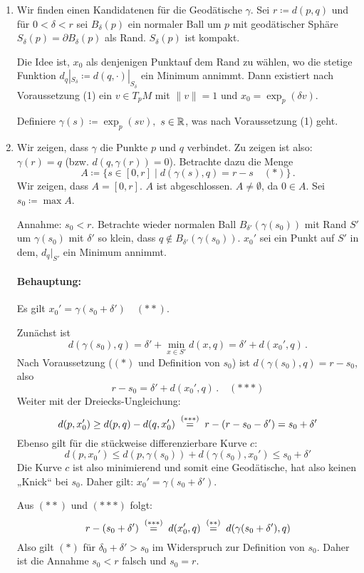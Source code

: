 \documentclass[a4paper,twoside,DIV15,BCOR12mm]{scrbook}
\renewcommand{\da}{\coloneqq}
\begin{document}
\begin{beweis}
\begin{enumerate}[1. {Schritt:}]
\item Wir finden einen Kandidatenen für die Geodätische $\gamma$. Sei $r\da d(p,q)$ und für $0< \delta < r$ sei $B_\delta(p)$ ein normaler Ball um $p$ mit geodätischer Sphäre $S_\delta(p) = \partial B_\delta(p)$ als Rand. $S_\delta(p)$ ist kompakt.

Die Idee ist, $x_0$ als denjenigen Punktauf dem Rand zu wählen, wo die stetige Funktion $d_q|_{S_\delta} \da d(q,\cdot)|_{S_\delta}$ ein Minimum annimmt. Dann existiert nach Voraussetzung (1) ein $v\in T_pM$ mit $\|v\|=1$ und $x_0 = \exp_p(\delta v)$.

Definiere $\gamma(s) \da \exp_p(s v),$ $s\in \mathbb{R}$, was nach Voraussetzung (1) geht.

\item Wir zeigen, dass $\gamma$ die Punkte $p$ und $q$ verbindet. Zu zeigen ist also: $\gamma(r)=q$ (bzw. $d(q,\gamma(r)) = 0$). Betrachte dazu die Menge
\[A\da \{ s\in [0,r] \mid d(\gamma(s),q) = r - s \quad (*) \}\,.\]
Wir zeigen, dass $A = [0,r]$. $A$ ist abgeschlossen. $A \ne \emptyset$, da $0\in A$. Sei $s_0 \da \max A$.

Annahme: $s_0 < r$. Betrachte wieder normalen Ball $B_{\delta'}(\gamma(s_0))$ mit Rand $S'$ um $\gamma(s_0)$ mit $\delta'$ so klein, dass $q\notin B_{\delta'}(\gamma(s_0))$. $x_0'$ sei ein Punkt auf $S'$ in dem, $d_q|_{S'}$ ein Minimum annimmt.

\paragraph{Behauptung:} Es gilt $x_0' = \gamma(s_0 + \delta')\quad (**)$.
\begin{beweis}
Zunächst ist 
\[d(\gamma(s_0),q) = \delta' + \min_{x\in S'} d(x,q) = \delta' + d(x_0',q)\,.\]
Nach Voraussetzung ($(*)$ und Definition von $s_0$) ist $d(\gamma(s_0),q) = r - s_0$, also \[r-s_0 = \delta' + d(x_0',q)\,.\quad(***)\]
Weiter mit der Dreiecks-Ungleichung: \[d(p,x_0') \ge d(p,q) - d(q,x_0') \gleichwegen{(***)} r - (r - s_0 - \delta') = s_0 + \delta'\]
Ebenso gilt für die stückweise differenzierbare Kurve $c$: \[d(p,x_0') \le d(p,\gamma(s_0)) + d(\gamma(s_0),x_0') \le s_0 + \delta '\]
Die Kurve $c$ ist also minimierend und somit eine Geodätische, hat also keinen „Knick“ bei $s_0$. Daher gilt: $x_0' = \gamma(s_0+\delta')$.
\end{beweis}
Aus $(**)$ und $(***)$ folgt:
\[
r - (s_0 + \delta ') \gleichwegen{(***)} d(x_0',q) \gleichwegen{(**)} d(\gamma(s_0 + \delta'),q)
\]
Also gilt $(*)$ für $\delta_0 + \delta' > s_0$ im Widerspruch zur Definition von $s_0$. Daher ist die Annahme $s_0 < r$ falsch und $s_0 =r$.
\end{enumerate}
\end{beweis}
\end{document}
